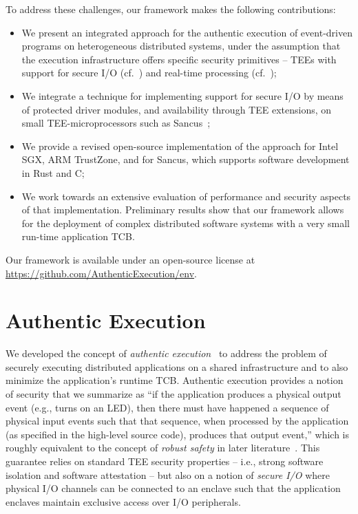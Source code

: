 \documentclass[sigconf]{acmart}
\begin{document}
%
To address these challenges, our framework makes the following
contributions:
%
\begin{itemize}
%
  \item We present an integrated approach for the authentic execution of
event-driven programs on heterogeneous distributed systems, under the
assumption that the execution infrastructure offers specific security
primitives -- \acp{TEE} with support for secure I/O
(cf.~\cite{noorman_sancus2}) and real-time processing
(cf.~\cite{alder_2021_aion});
%
  \item We integrate a technique for implementing support for secure I/O by
means of protected driver modules, and availability through \ac{TEE}
extensions, on small \ac{TEE}-microprocessors such as
Sancus~\cite{noorman_sancus2};
%
  \item We provide a revised open-source implementation of the approach for
Intel SGX, ARM TrustZone, and for Sancus, which supports software
development in Rust and C;
%
  \item We work towards an extensive evaluation of performance and security
aspects of that implementation. Preliminary results show that our framework
allows for the deployment of complex distributed software systems with a
very small run-time application \ac{TCB}.
%
\end{itemize}
%
Our framework is available under an open-source license at
\url{https://github.com/AuthenticExecution/env}.


\section{Authentic Execution}

We developed the concept of \emph{authentic
execution}~\cite{noorman:authentic-execution} to address the problem of
securely executing distributed applications on a shared infrastructure and
to also minimize the application's runtime \ac{TCB}. Authentic
execution provides a notion of security that we summarize as ``if the
application produces a physical output event (e.g., turns on an LED), then
there must have happened a sequence of physical input events such that that
sequence, when processed by the application (as specified in the high-level
source code), produces that output event,'' which is roughly equivalent to
the concept of \emph{robust safety} in later
literature~\cite{abate2019journey}. This guarantee relies on standard
\ac{TEE} security properties -- i.e., strong software isolation and
software attestation -- but also on a notion of \emph{secure I/O} where
physical I/O channels can be connected to an 
enclave
such that the application enclaves maintain exclusive access over
I/O peripherals.
\end{document}
